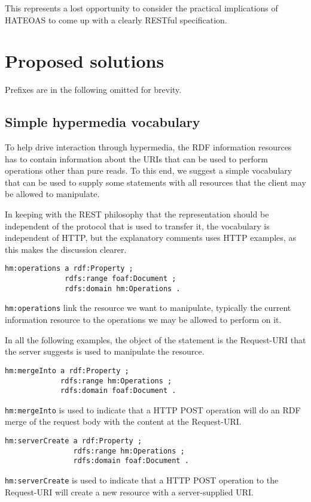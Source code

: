 \documentclass{llncs}
\begin{document}
This represents a lost opportunity to consider the practical
implications of HATEOAS to come up with a clearly RESTful specification.



\section{Proposed solutions}

Prefixes are in the following omitted for brevity.

\subsection{Simple hypermedia vocabulary}

To help drive interaction through hypermedia, the RDF information
resources has to contain information about the URIs that can be used
to perform operations other than pure reads. To this end, we suggest a
simple vocabulary that can be used to supply some statements with all
resources that the client may be allowed to manipulate.

In keeping with the REST philosophy that the representation should be
independent of the protocol that is used to transfer it, the
vocabulary is independent of HTTP, but the explanatory comments uses
HTTP examples, as this makes the discussion clearer.

\begin{verbatim}
hm:operations a rdf:Property ;
              rdfs:range foaf:Document ;
              rdfs:domain hm:Operations .
\end{verbatim}
\texttt{hm:operations} link the resource we want to manipulate,
typically the current information resource to the operations we may be
allowed to perform on it.


In all the following examples, the object of the statement is the
Request-URI that the server suggests is used to manipulate the resource.
\begin{verbatim}
hm:mergeInto a rdf:Property ;
             rdfs:range hm:Operations ;
             rdfs:domain foaf:Document .
\end{verbatim}
\texttt{hm:mergeInto} is used to indicate that a HTTP POST operation
will do an RDF merge of the request body with the content at the
Request-URI.

\begin{verbatim}
hm:serverCreate a rdf:Property ;
                rdfs:range hm:Operations ;
                rdfs:domain foaf:Document .
\end{verbatim}
\texttt{hm:serverCreate} is used to indicate that a HTTP POST
operation to the Request-URI will create a new resource with a
server-supplied URI.
\end{document}
